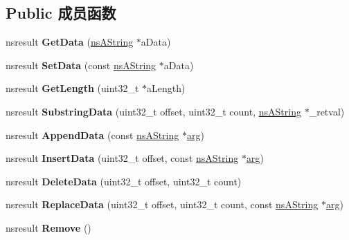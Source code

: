 \subsection*{Public 成员函数}
\begin{DoxyCompactItemize}
\item 
\mbox{\label{interfacens_i_d_o_m_character_data_a80b113fca69629933f764850d7558197}} 
nsresult {\bfseries Get\+Data} (\hyperlink{structns_string_container}{ns\+A\+String} $\ast$a\+Data)
\item 
\mbox{\label{interfacens_i_d_o_m_character_data_abf55c610f096566d6a0677573d0d04cd}} 
nsresult {\bfseries Set\+Data} (const \hyperlink{structns_string_container}{ns\+A\+String} $\ast$a\+Data)
\item 
\mbox{\label{interfacens_i_d_o_m_character_data_a773ed3bee17e59ff7040a81c0731a488}} 
nsresult {\bfseries Get\+Length} (uint32\+\_\+t $\ast$a\+Length)
\item 
\mbox{\label{interfacens_i_d_o_m_character_data_a58fe47937e191b769633686da8bff38e}} 
nsresult {\bfseries Substring\+Data} (uint32\+\_\+t offset, uint32\+\_\+t count, \hyperlink{structns_string_container}{ns\+A\+String} $\ast$\+\_\+retval)
\item 
\mbox{\label{interfacens_i_d_o_m_character_data_a1b277270c23ef980d34f90ba1058f107}} 
nsresult {\bfseries Append\+Data} (const \hyperlink{structns_string_container}{ns\+A\+String} $\ast$\hyperlink{interfacevoid}{arg})
\item 
\mbox{\label{interfacens_i_d_o_m_character_data_aee44735164ca9da1eef84308257c1c5e}} 
nsresult {\bfseries Insert\+Data} (uint32\+\_\+t offset, const \hyperlink{structns_string_container}{ns\+A\+String} $\ast$\hyperlink{interfacevoid}{arg})
\item 
\mbox{\label{interfacens_i_d_o_m_character_data_a8302333ee756df6a4dfd1ca37048a6cf}} 
nsresult {\bfseries Delete\+Data} (uint32\+\_\+t offset, uint32\+\_\+t count)
\item 
\mbox{\label{interfacens_i_d_o_m_character_data_ab59c51d284e0d8a32b7ffcfef08bd71d}} 
nsresult {\bfseries Replace\+Data} (uint32\+\_\+t offset, uint32\+\_\+t count, const \hyperlink{structns_string_container}{ns\+A\+String} $\ast$\hyperlink{interfacevoid}{arg})
\item 
\mbox{\label{interfacens_i_d_o_m_character_data_a20ef5ffa336ecf79dcb456df1b212d3c}} 
nsresult {\bfseries Remove} ()
\end{DoxyCompactItemize}
